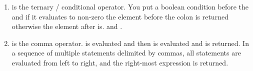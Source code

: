 \begin{enumerate}
	\item {} is the ternary / conditional operator. You put a boolean condition before the \? and if it evaluates to non-zero the element before the colon is returned otherwise the element after is.  and .
	\item {} is the comma operator.  is evaluated and then  is evaluated and  is returned. In a sequence of multiple statements delimited by commas, all statements are evaluated from left to right, and the right-most expression is returned.
\end{enumerate}


